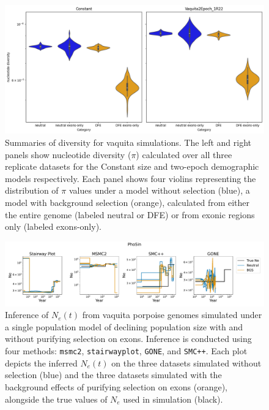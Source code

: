 \documentclass[hidelinks]{article}
\newcommand{\msmc}{\texttt{msmc2}\xspace}
\newcommand{\stairway}{\texttt{stairwayplot}\xspace}
\newcommand{\gone}{\texttt{GONE}\xspace}
\newcommand{\smcpp}{\texttt{SMC++}\xspace}
\begin{document}
\begin{figure}[h]
    \centering
    \includegraphics[width=\textwidth]{figures/PhoSin/summary_stats.png}
    \caption{
    \label{fig:vaquita-summary-stats}
    Summaries of diversity for vaquita simulations. The left and right panels show
    nucleotide diversity ($\pi$) calculated over all three replicate datasets
    for the Constant size and two-epoch demographic models respectively.
    Each panel shows four violins representing the distribution of $\pi$ values
    under a model without selection (blue), a model with background selection (orange),
    calculated from either the entire genome (labeled neutral or DFE)
    or from exonic regions only (labeled exons-only).
    }
\end{figure}

\begin{figure}[b!]
    \centering
    \includegraphics[width=\textwidth]{figures/PhoSin/Vaquita2Epoch_1R22/estimated_Ne_t_final.pdf}
    \caption{
    \label{fig:vaquita-demography}
    Inference of $N_e(t)$ from vaquita porpoise genomes simulated under a single population 
    model of declining population size \citep{robinson2022critically}
    with and without purifying selection on exons. 
    Inference is conducted using four methods:    
    \msmc \citep{Schiffels2020}, \stairway \citep{liu2020stairway}, \gone \citep{santiago2020recent}, and \smcpp \citep{terhorst2017robust}.
    Each plot depicts the inferred $N_e(t)$ on the three datasets simulated without selection (blue)
    and the three datasets simulated with the background effects of purifying selection on exons (orange),
    alongside the true values of $N_e$ used in simulation (black).
}
\end{figure}
\end{document}
